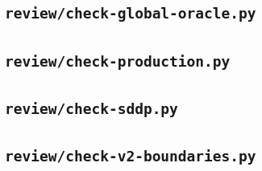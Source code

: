 \subsection{\texttt{review/check-global-oracle.py}}
\subsection{\texttt{review/check-production.py}}
\subsection{\texttt{review/check-sddp.py}}
\subsection{\texttt{review/check-v2-boundaries.py}}
